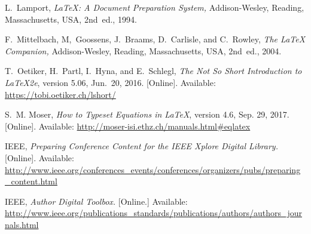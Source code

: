 \documentclass[conference,letterpaper]{IEEEtran}
\begin{document}
%
%



\begin{thebibliography}{9}

L.~Lamport,
  \emph{\LaTeX: A Document Preparation System,} 
  Addison-Wesley, Reading, Massachusetts, USA, 2nd~ed., 1994. 

F.~Mittelbach, M,~Goossens, J.~Braams, D.~Carlisle, and
C.~Rowley, \emph{The {\LaTeX} Companion,} Addison-Wesley,
Reading, Massachusetts, USA, 2nd~ed., 2004.

T.~Oetiker, H.~Partl, I.~Hyna, and E.~Schlegl, \emph{The Not So Short
  Introduction to {\LaTeX2e}}, version 5.06, Jun.~20, 2016. [Online].
  Available: \url{https://tobi.oetiker.ch/lshort/}

S.~M. Moser, \emph{How to Typeset Equations in {\LaTeX}}, version 4.6,
  Sep. 29, 2017. [Online]. Available:
  \url{http://moser-isi.ethz.ch/manuals.html#eqlatex}

IEEE, \emph{Preparing Conference Content for the IEEE Xplore Digital
  Library.} [Online]. Available:
  \url{http://www.ieee.org/conferences_events/conferences/organizers/pubs/preparing_content.html}

IEEE, \emph{Author Digital Toolbox.} [Online.] Available:
  \url{http://www.ieee.org/publications_standards/publications/authors/authors_journals.html}

\end{thebibliography}
\end{document}
